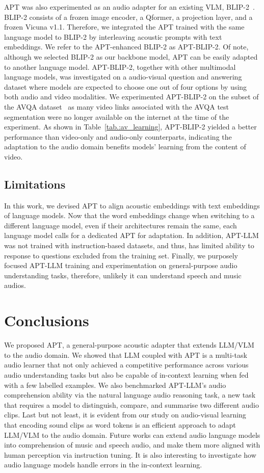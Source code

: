 \documentclass{article} %
\begin{document}
APT was also experimented as an audio adapter for an existing VLM, BLIP-2~\citep{li_blip-2_2023}. BLIP-2 consists of a frozen image encoder, a Qformer, a projection layer, and a frozen Vicuna v1.1. Therefore, we integrated the APT trained with the same language model to BLIP-2 by interleaving acoustic prompts with text embeddings. We refer to the APT-enhanced BLIP-2 as APT-BLIP-2. Of note, although we selected BLIP-2 as our backbone model, APT can be easily adapted to another language model. APT-BLIP-2, together with other multimodal language models, was investigated on a audio-visual question and answering dataset where models are expected to choose one out of four options by using both audio and video modalities. We experimented APT-BLIP-2 on the subset of the AVQA dataset~\citep{yang_avqa_2022} as many video links associated with the AVQA test segmentation were no longer available on the internet at the time of the experiment. As shown in Table~\ref{tab.:av_learning}, APT-BLIP-2 yielded a better performance than video-only and audio-only counterparts, indicating the adaptation to the audio domain benefits models' learning from the content of video. 

\subsection{Limitations} \label{subsec:limitations}
In this work, we devised APT to align acoustic embeddings with text embeddings of language models. Now that the word embeddings change when switching to a different language model, even if their architectures remain the same, each language model calls for a dedicated APT for adaptation. In addition, APT-LLM was not trained with instruction-based datasets, and thus, has limited ability to response to questions excluded from the training set. Finally, we purposely focused APT-LLM training and experimentation on general-purpose audio understanding tasks, therefore, unlikely it can understand speech and music audios.

\section{Conclusions} \label{sec:conclusions}
We proposed APT, a general-purpose acoustic adapter that extends LLM/VLM to the audio domain. We showed that LLM coupled with APT is a multi-task audio learner that not only achieved a competitive performance across various audio understanding tasks but also be capable of in-context learning when fed with a few labelled examples. We also benchmarked APT-LLM's audio comprehension ability via the natural language audio reasoning task, a new task that requires a model to distinguish, compare, and summarise two different audio clips. Last but not least, it is evident from our study on audio-visual learning that encoding sound clips as word tokens is an efficient approach to adapt LLM/VLM to the audio domain. Future works can extend audio language models into comprehension of music and speech audio, and make them more aligned with human perception via instruction tuning. It is also interesting to investigate how audio language models handle errors in the in-context learning.
\end{document}
